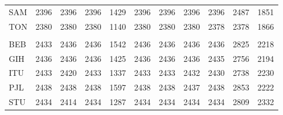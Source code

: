 \documentclass[]{report}
\begin{document}
\begin{table}
{\begin{tabular}[t]{lrrrrrrrrrr}
\hspace{1em}SAM & 2396 & 2396 & 2396 & 1429 & 2396 & 2396 & 2396 & 2396 & 2487 & 1851\\
\hspace{1em}TON & 2380 & 2380 & 2380 & 1140 & 2380 & 2380 & 2380 & 2378 & 2378 & 1866\\
\addlinespace[0.3em]
\multicolumn{11}{l}{\textbf{SAS}}\\
\hspace{1em}BEB & 2433 & 2436 & 2436 & 1542 & 2436 & 2436 & 2436 & 2436 & 2825 & 2218\\
\hspace{1em}GIH & 2436 & 2436 & 2436 & 1425 & 2436 & 2436 & 2436 & 2435 & 2756 & 2194\\
\hspace{1em}ITU & 2433 & 2420 & 2433 & 1337 & 2433 & 2433 & 2432 & 2430 & 2738 & 2230\\
\hspace{1em}PJL & 2438 & 2438 & 2438 & 1597 & 2438 & 2438 & 2437 & 2438 & 2853 & 2222\\
\hspace{1em}STU & 2434 & 2414 & 2434 & 1287 & 2434 & 2434 & 2434 & 2434 & 2809 & 2332\\
\bottomrule
\end{tabular}}
\end{table}
\end{document}
